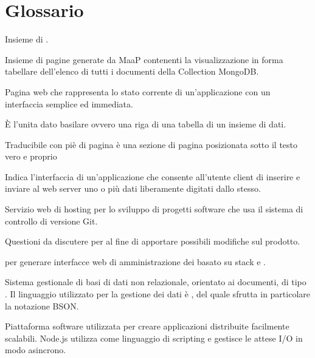 \clearpage
\section{Glossario}


	Insieme di .

	Insieme di pagine generate da MaaP contenenti la visualizzazione in forma tabellare dell'elenco di tutti i documenti della Collection MongoDB.


	Pagina web che rappresenta lo stato corrente di un'applicazione con un interfaccia semplice ed immediata.

	\`E l'unita dato basilare ovvero una riga di una tabella di un insieme di dati.


	Traducibile con piè di pagina è una sezione di pagina posizionata sotto il testo vero e proprio

	Indica l'interfaccia di un'applicazione che consente all'utente client di inserire e inviare al web server uno o più dati liberamente digitati dallo stesso.


	Servizio web di hosting per lo sviluppo di progetti software che usa il sistema di controllo di versione Git.


	Questioni da discutere per al fine di apportare possibili modifiche sul prodotto.
	

	 per generare interfacce web di amministrazione dei  basato su stack  e .


	Sistema gestionale di basi di dati non relazionale, orientato ai documenti, di tipo . Il linguaggio utilizzato per la gestione dei dati è , del quale sfrutta in particolare la notazione BSON.


	Piattaforma software utilizzata per creare applicazioni distribuite facilmente scalabili.
	Node.js utilizza  come linguaggio di scripting e gestisce le attese I/O in modo asincrono.


